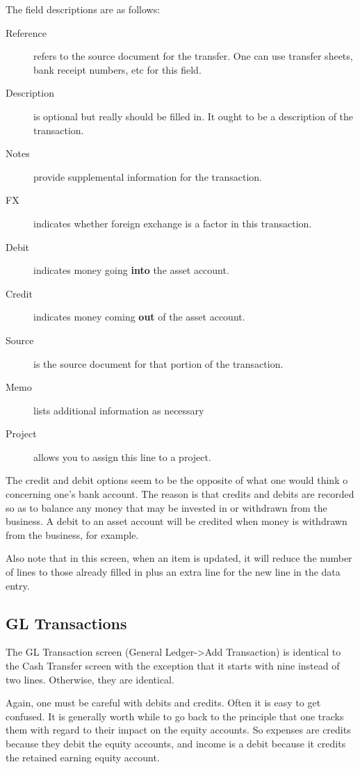\documentclass{article}
\begin{document}
The field descriptions are as follows:

\begin{description}
\item[Reference] refers to the source document for the transfer.  One can use
transfer sheets, bank receipt numbers, etc for this field.
\item[Description] is optional but really should be filled in.  It ought to be a
description of the transaction.
\item[Notes] provide supplemental information for the transaction.
\item[FX] indicates whether foreign exchange is a factor in this transaction.
\item[Debit] indicates money going {\bf into} the asset account.
\item[Credit] indicates money coming {\bf out} of the asset account.
\item[Source] is the source document for that portion of the transaction.
\item[Memo] lists additional information as necessary
\item[Project] allows you to assign this line to a project.
\end{description}

The credit and debit options seem to be the opposite of what one would think o
concerning one's bank account.  The reason is that credits and debits are
recorded so as to balance any money that may be invested in or withdrawn from
the business.  A debit to an asset account will be credited when money is
withdrawn from the business, for example.

Also note that in this screen, when an item is updated, it will reduce the
number of lines to those already filled in plus an extra line for the new line
in the data entry.

\subsection{GL Transactions}

The GL Transaction screen (General Ledger-\textgreater Add Transaction) is
identical to the Cash Transfer screen with the exception that it starts with
nine instead of two lines.  Otherwise, they are identical.

Again, one must be careful with debits and credits.  Often it is easy to get
confused.  It is generally worth while to go back to the principle that one
tracks them with regard to their impact on the equity accounts.  So expenses are
credits because they debit the equity accounts, and income is a debit because it
credits the retained earning equity account.
\end{document}

